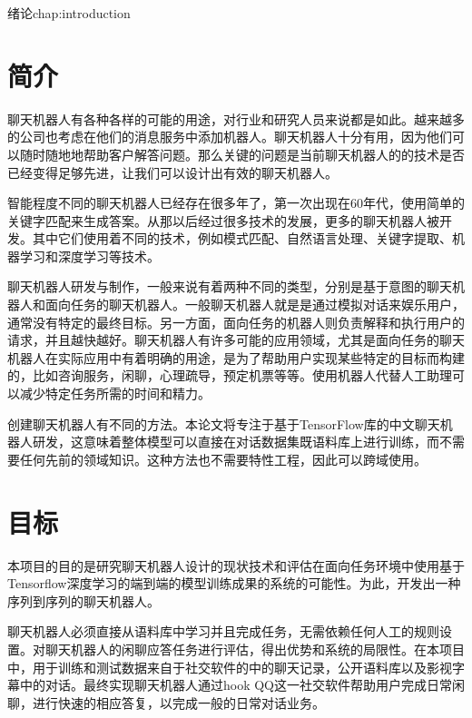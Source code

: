 \begin{cuzchapter}{绪论}{chap:introduction}

\section{简介}\label{sec:background}

聊天机器人有各种各样的可能的用途，对行业和研究人员来说都是如此。越来越多的公司也考虑在他们的消息服务中添加机器人。聊天机器人十分有用，因为他们可以随时随地地帮助客户解答问题。那么关键的问题是当前聊天机器人的的技术是否已经变得足够先进，让我们可以设计出有效的聊天机器人。

智能程度不同的聊天机器人已经存在很多年了，第一次出现在60年代，\cite{Weizenbaum:1966:ECP:365153.365168}使用简单的关键字匹配来生成答案。从那以后经过很多技术的发展，更多的聊天机器人被开发。其中它们使用着不同的技术，例如模式匹配、自然语言处理、关键字提取、机器学习和深度学习等技术。

聊天机器人研发与制作，一般来说有着两种不同的类型，分别是基于意图的聊天机器人和面向任务的聊天机器人。一般聊天机器人就是是通过模拟对话来娱乐用户，通常没有特定的最终目标。另一方面，面向任务的机器人则负责解释和执行用户的请求，并且越快越好。聊天机器人有许多可能的应用领域，尤其是面向任务的聊天机器人在实际应用中有着明确的用途，是为了帮助用户实现某些特定的目标而构建的，比如咨询服务，闲聊，心理疏导，预定机票等等。使用机器人代替人工助理可以减少特定任务所需的时间和精力。

创建聊天机器人有不同的方法。本论文将专注于基于TensorFlow库的中文聊天机器人研发，这意味着整体模型可以直接在对话数据集既语料库上进行训练，而不需要任何先前的领域知识。这种方法也不需要特性工程，因此可以跨域使用。
\section{目标}\label{sec:background}

本项目的目的是研究聊天机器人设计的现状技术和评估在面向任务环境中使用基于Tensorflow深度学习的端到端的模型训练成果的系统的可能性。为此，开发出一种序列到序列的聊天机器人。

聊天机器人必须直接从语料库中学习并且完成任务，无需依赖任何人工的规则设置。对聊天机器人的闲聊应答任务进行评估，得出优势和系统的局限性。在本项目中，用于训练和测试数据来自于社交软件的中的聊天记录，公开语料库以及影视字幕中的对话。最终实现聊天机器人通过hook QQ这一社交软件帮助用户完成日常闲聊，进行快速的相应答复，以完成一般的日常对话业务。

\end{cuzchapter}